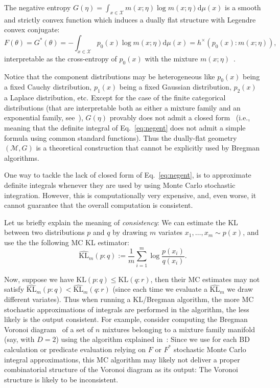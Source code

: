 \documentclass[graybox]{svmult}
\def\dmu{\mathrm{d}\mu}
\def\KL{\mathrm{KL}}
\def\eqdef{:=}
\def\calX{\mathcal{X}}
\def\calM{\mathcal{M}}
\begin{document}
The negative entropy $G(\eta)=\int_{x\in\calX} m(x;\eta)\log m(x;\eta)\dmu(x)$ is a smooth and strictly convex function which induces a dually flat structure with Legendre convex conjugate:
\begin{equation}
F(\theta)=G^*(\theta)=-\int_{x\in\calX} p_0(x)\log m(x;\eta)\dmu(x)=h^\times(p_0(x):m(x;\eta)),
\end{equation} 
interpretable as the cross-entropy of $p_0(x)$ with the mixture $m(x;\eta)$~\cite{wmixture-2017}.


Notice that the component distributions may be heterogeneous like $p_0(x)$ being a fixed Cauchy distribution, $p_1(x)$ being a fixed Gaussian distribution, $p_2(x)$ a Laplace distribution, etc.
Except for the case of the finite categorical distributions (that are interpretable both as either a mixture family and an exponential family, see~\cite{IG-2016}), $G(\eta)$  provably does not admit a closed form~\cite{KLnotanalytic-2004} (i.e., meaning that the definite integral of Eq.~\ref{eq:negent} does not admit a simple formula using common standard functions). 
Thus the    dually-flat geometry $(\calM,G)$ is a theoretical construction that cannot be explicitly used by Bregman algorithms.

One way to tackle the lack of closed form of Eq.~\ref{eq:negent}, is to approximate definite integrals whenever they are used by using Monte Carlo stochastic integration.
However, this is computationally very expensive, and, even worse, it cannot guarantee that the overall computation is consistent.

Let us briefly explain the meaning of {\em consistency}:
We can estimate the KL between two distributions $p$ and $q$ by drawing $m$ variates $x_1,\ldots,x_m \sim p(x)$, and use the 
the following MC KL estimator:
\begin{equation}
\widehat{\KL}_m(p:q) \eqdef \frac{1}{m} \sum_{i=1}^m    \log \frac{p(x_i)}{q(x_i)}.
\end{equation}

Now, suppose we have $\KL(p:q)\leq \KL(q:r)$, then their MC estimates may not satisfy $\widehat{\KL}_m(p:q)<\widehat{\KL}_m(q:r)$ (since each time we evaluate a $\widehat{\KL}_m$ we draw different variates).
Thus when running a KL/Bregman algorithm, the more MC stochastic  approximations of integrals are performed in the algorithm, the less likely is the output consistent.
For example, consider computing the Bregman Voronoi diagram~\cite{BVD-2007} of a set of $n$ mixtures belonging to a mixture family manifold (say, with $D=2$) using the algorithm explained in~\cite{BVD-2007}: 
Since we use for each BD calculation or predicate evaluation relying on $F$ or $F^*$ stochastic Monte Carlo integral approximations, this MC algorithm may likely not deliver a proper  combinatorial structure of the Voronoi diagram as its output: The Voronoi structure is likely to be inconsistent.
\end{document}
